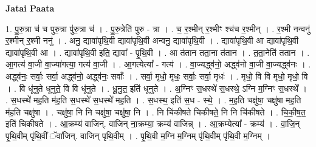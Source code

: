 \documentclass[17pt]{extarticle}
\begin{document}
\textbf{Jatai Paata} \newline

1. पु॒रु॒त्रा च॑ च पुरु॒त्रा पु॑रु॒त्रा च॑ । . पु॒रु॒त्रेति॑ पुरु - त्रा । . च॒ र॒श्मीन् र॒श्मीꣳ श्च॑च र॒श्मीन् । . र॒श्मी नन्वनु॑ र॒श्मीन् र॒श्मी ननु॑ । . अनु॒ द्यावा॑पृथि॒वी द्यावा॑पृथि॒वी अन्वनु॒ द्यावा॑पृथि॒वी । . द्यावा॑पृथि॒वी आ द्यावा॑पृथि॒वी द्यावा॑पृथि॒वी आ । . द्यावा॑पृथि॒वी इति॒ द्यावा᳚ - पृ॒थि॒वी । . आ त॑तान तता॒ना त॑तान । . त॒ता॒नेति॑ ततान । . आ॒गत्य॑ वा॒जी वा॒ज्या॑गत्या॒ गत्य॑ वा॒जी । . आ॒गत्येत्या᳚ - गत्य॑ । . वा॒ज्यद्ध्व॑नो॒ अद्ध्व॑नो वा॒जी वा॒ज्यद्ध्व॑नः । . अद्ध्व॑नः॒ सर्वाः॒ सर्वा॒ अद्ध्व॑नो॒ अद्ध्व॑नः॒ सर्वाः᳚ । . सर्वा॒ मृधो॒ मृधः॒ सर्वाः॒ सर्वा॒ मृधः॑ । . मृधो॒ वि वि मृधो॒ मृधो॒ वि । . वि धू॑नुते धूनुते॒ वि वि धू॑नुते । . धू॒नु॒त॒ इति॑ धूनुते । . अ॒ग्निꣳ स॒धस्थे॑ स॒धस्थे॒ ऽग्नि म॒ग्निꣳ स॒धस्थे᳚ । . स॒धस्थे॑ मह॒ति म॑ह॒ति स॒धस्थे॑ स॒धस्थे॑ मह॒ति । . स॒धस्थ॒ इति॑ स॒ध - स्थे॒ । . म॒ह॒ति चक्षु॑षा॒ चक्षु॑षा मह॒ति म॑ह॒ति चक्षु॑षा । . चक्षु॑षा॒ नि नि चक्षु॑षा॒ चक्षु॑षा॒ नि । . नि चि॑कीषते चिकीषते॒ नि नि चि॑कीषते । . चि॒की॒ष॒त॒ इति॑ चिकीषते । . आ॒क्रम्य॑ वाजिन्. वाजिन् ना॒क्रम्या॒ क्रम्य॑ वाजिन्न् । . आ॒क्रम्येत्या᳚ - क्रम्य॑ । . वा॒जि॒न् पृ॒थि॒वीम् पृ॑थि॒वीं ॅवा॑जिन्. वाजिन् पृथि॒वीम् । . पृ॒थि॒वी म॒ग्नि म॒ग्निम् पृ॑थि॒वीम् पृ॑थि॒वी म॒ग्निम् । \newline
\end{document}
